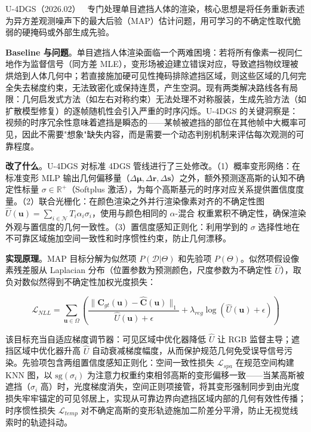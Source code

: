 U-4DGS（2026.02）~\cite{2602_06343} 专门处理单目遮挡人体的渲染，核心思想是将任务重新表述为异方差观测噪声下的最大后验（MAP）估计问题，用可学习的不确定性取代脆弱的硬掩码或外部生成先验。

\textbf{Baseline 与问题}。单目遮挡人体渲染面临一个两难困境：若将所有像素一视同仁地作为监督信号（同方差 MLE），变形场被迫建立错误对应，导致遮挡物纹理被烘焙到人体几何中；若直接施加硬可见性掩码排除遮挡区域，则这些区域的几何完全失去梯度约束，无法致密化或保持连贯，产生空洞。现有两类解决路线各有局限：几何启发式方法（如左右对称约束）无法处理不对称服装，生成先验方法（如扩散模型修复）的逐帧随机性会引入严重的时序闪烁。U-4DGS 的关键洞察是：视频的时序冗余性意味着遮挡是瞬态的——某帧被遮挡的部位在其他帧中大概率可见，因此不需要"想象"缺失内容，而是需要一个动态判别机制来评估每次观测的可靠程度。

\textbf{改了什么}。U-4DGS 对标准 4DGS 管线进行了三处修改。（1）概率变形网络：在标准变形 MLP 输出几何偏移量（$\Delta\boldsymbol{\mu}, \Delta\mathbf{r}, \Delta\mathbf{s}$）之外，额外预测逐高斯的认知不确定性标量 $\sigma \in \mathbb{R}^+$（Softplus 激活），为每个高斯基元的时序对应关系提供置信度度量。（2）联合光栅化：在颜色渲染之外并行渲染像素对齐的不确定性图 $\hat{U}(\mathbf{u}) = \sum_{i \in \mathcal{N}} T_i \alpha_i \sigma_i$，使用与颜色相同的 $\alpha$-混合 权重累积不确定性，确保渲染外观与置信度的几何一致性。（3）置信度感知正则化：利用学到的 $\sigma$ 选择性地在不可靠区域施加空间一致性和时序惯性约束，防止几何漂移。

\textbf{实现原理}。MAP 目标分解为似然项 $P(\mathcal{D}|\Theta)$ 和先验项 $P(\Theta)$。似然项假设像素残差服从 Laplacian 分布（位置参数为预测颜色，尺度参数为不确定性 $\hat{U}$），取负对数似然得到不确定性加权光度损失：

\begin{equation}
\mathcal{L}_{NLL} = \sum_{\mathbf{u} \in \Omega} \left( \frac{\|\mathbf{C}_{gt}(\mathbf{u}) - \hat{\mathbf{C}}(\mathbf{u})\|_1}{\hat{U}(\mathbf{u}) + \epsilon} + \lambda_{reg} \log(\hat{U}(\mathbf{u}) + \epsilon) \right)
\end{equation}

该目标充当自适应梯度调节器：可见区域中优化器降低 $\hat{U}$ 让 RGB 监督主导；遮挡区域中优化器升高 $\hat{U}$ 自动衰减梯度幅度，从而保护规范几何免受误导信号污染。先验项包含两组置信度感知正则化：空间一致性损失 $\mathcal{L}_{spa}$ 在规范空间构建 KNN 图，以 $\text{sg}(\sigma_i)$ 为注意力权重约束相邻高斯的变形偏移一致——当某高斯被遮挡（$\sigma_i$ 高）时，光度梯度消失，空间正则项接管，将其变形强制同步到由光度损失牢牢锚定的可见邻居上，实现从可靠边界向遮挡区域内部的几何有效性传播；时序惯性损失 $\mathcal{L}_{temp}$ 对不确定高斯的变形轨迹施加二阶差分平滑，防止无视觉线索时的轨迹抖动。

